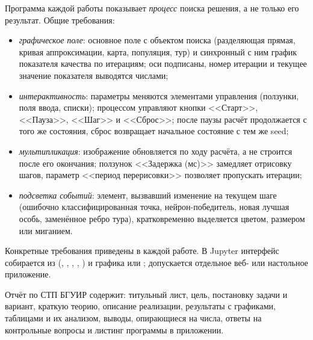 Программа каждой работы показывает \emph{процесс} поиска решения, а не только его результат. Общие
требования:
\begin{itemize}
\item \emph{графическое поле}: основное поле с объектом поиска (разделяющая прямая, кривая
аппроксимации, карта, популяция, тур) и синхронный с ним график показателя качества по итерациям; оси
подписаны, номер итерации и текущее значение показателя выводятся числами;
\item \emph{интерактивность}: параметры меняются элементами управления (ползунки, поля ввода, списки);
процессом управляют кнопки <<Старт>>, <<Пауза>>, <<Шаг>> и <<Сброс>>; после паузы расчёт продолжается
с того же состояния, сброс возвращает начальное состояние с тем же seed;
\item \emph{мультипликация}: изображение обновляется по ходу расчёта, а не строится после его
окончания; ползунок <<Задержка (мс)>> замедляет отрисовку шагов, параметр <<период перерисовки>>
позволяет пропускать итерации;
\item \emph{подсветка событий}: элемент, вызвавший изменение на текущем шаге (ошибочно
классифицированная точка, нейрон-победитель, новая лучшая особь, заменённое ребро тура), кратковременно
выделяется цветом, размером или миганием.
\end{itemize}
Конкретные требования приведены в каждой работе. В Jupyter интерфейс собирается из 
(, , , , ) и графика
 или ; допускается
отдельное веб- или настольное приложение.

Отчёт по СТП БГУИР содержит: титульный лист, цель, постановку задачи и вариант, краткую теорию,
описание реализации, результаты с графиками, таблицами и их анализом, выводы, опирающиеся на числа,
ответы на контрольные вопросы и листинг программы в приложении.

